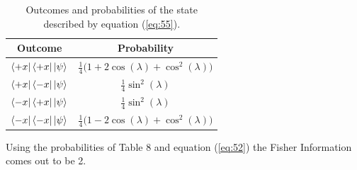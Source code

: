 \documentclass[twocolumn]{article}
\begin{document}
\begin{table}[h!]
\begin{center}
\begin{tabular}{ |c|c| }
\hline Outcome & Probability \\
\hline $\bra{+x}\bra{+x}\ket{\psi}$ & $\frac{1}{4}\big(1+2\cos{(\lambda)}+\cos^2{(\lambda)}\big)$ \\
\hline $\bra{+x}\bra{-x}\ket{\psi}$ & $\frac{1}{4}\sin^2{(\lambda)}$ \\
\hline $\bra{-x}\bra{+x}\ket{\psi}$ & $\frac{1}{4}\sin^2{(\lambda)}$ \\
\hline $\bra{-x}\bra{-x}\ket{\psi}$ & $\frac{1}{4}\big(1-2\cos{(\lambda)}+\cos^2{(\lambda)}\big)$ \\
\hline
\end{tabular}
\caption{Outcomes and probabilities of the state described by equation (\ref{eq:55}).}
\end{center}
\end{table} 
Using the probabilities of Table 8 and equation (\ref{eq:52}) the Fisher Information comes out to be 2. 
\end{document}
